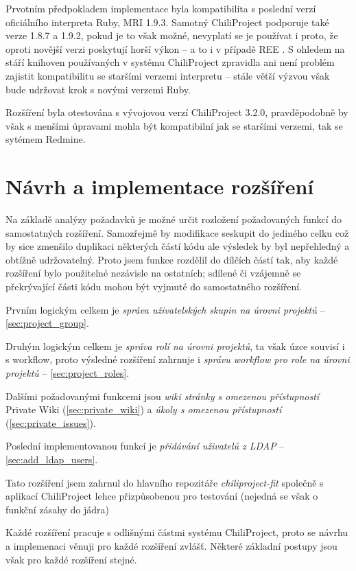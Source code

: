 \documentclass[thesis=B,czech]{FITthesis}[2012/05/02]
\begin{document}
Prvotním předpokladem implementace byla kompatibilita s poslední verzí
oficiálního interpreta Ruby, \gls{MRI} 1.9.3. Samotný ChiliProject
podporuje také verze 1.8.7 a 1.9.2, pokud je to však možné, nevyplatí se
je používat i proto, že oproti novější verzi poskytují horší výkon -- a
to i v případě \gls{REE} \citep[End of Life]{REEEOL}. S ohledem na stáří
knihoven používaných v systému ChiliProject zpravidla ani není problém
zajistit kompatibilitu se staršími verzemi interpretu -- stále větší
výzvou však bude udržovat krok s novými verzemi Ruby.

Rozšíření byla otestována s vývojovou verzí ChiliProject 3.2.0,
pravděpodobně by však s menšími úpravami mohla být kompatibilní jak se
staršími verzemi, tak se sytémem Redmine.

\chapter{Návrh a implementace rozšíření}

Na základě analýzy požadavků je možné určit rozložení požadovaných
funkcí do samostatných rozšíření. Samozřejmě by modifikace seskupit do
jediného celku což by sice zmenšilo duplikaci některých částí kódu ale
výsledek by byl nepřehledný a obtížně udržovatelný. Proto jsem funkce
rozdělil do dílčích částí tak, aby každé rozšíření bylo použitelné
nezávisle na ostatních; sdílené či vzájemně se překrývající části kódu
mohou být vyjmuté do samostatného rozšíření.

Prvním logickým celkem je \emph{správa uživatelských skupin na úrovni
projektů} -- \ref{sec:project_group}.

Druhým logickým celkem je \emph{správa rolí na úrovni projektů}, ta však
úzce souvisí i s \gls{workflow}, proto výsledné rozšíření zahrnuje i
\emph{správu workflow pro role na úrovni projektů} -- \ref{sec:project_roles}.

Dalšími požadovanými funkcemi jsou \emph{wiki stránky s omezenou
přístupností} Private Wiki (\ref{sec:private_wiki}) a \emph{úkoly s
omezenou přístupností} (\ref{sec:private_issues}).

Poslední implementovanou funkcí je \emph{přidávání uživatelů z
\gls{LDAP}} -- \ref{sec:add_ldap_users}.

Tato rozšíření jsem zahrnul do hlavního repozitáře
\emph{chiliproject-fit} společně s aplikací ChiliProject lehce
přizpůsobenou pro testování (nejedná se však o funkční zásahy do jádra)

Každé rozšíření pracuje s odlišnými částmi systému ChiliProject, proto
se návrhu a implemenaci věnuji pro každé rozšíření zvlášť. Některé
základní postupy jsou však pro každé rozšíření stejné.
\end{document}
